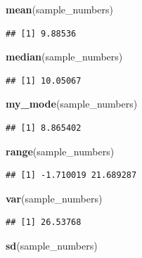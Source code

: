 \documentclass[]{book}
\newenvironment{Shaded}{\begin{snugshade}}{\end{snugshade}}
\newcommand{\KeywordTok}[1]{\textcolor[rgb]{0.13,0.29,0.53}{\textbf{{#1}}}}
\newcommand{\NormalTok}[1]{{#1}}
\theoremstyle{definition}
\theoremstyle{definition}
\theoremstyle{definition}
\theoremstyle{remark}
\begin{document}
\begin{Shaded}
\begin{Highlighting}[]
\KeywordTok{mean}\NormalTok{(sample_numbers)}
\end{Highlighting}
\end{Shaded}

\begin{verbatim}
## [1] 9.88536
\end{verbatim}

\begin{Shaded}
\begin{Highlighting}[]
\KeywordTok{median}\NormalTok{(sample_numbers)}
\end{Highlighting}
\end{Shaded}

\begin{verbatim}
## [1] 10.05067
\end{verbatim}

\begin{Shaded}
\begin{Highlighting}[]
\KeywordTok{my_mode}\NormalTok{(sample_numbers)}
\end{Highlighting}
\end{Shaded}

\begin{verbatim}
## [1] 8.865402
\end{verbatim}

\begin{Shaded}
\begin{Highlighting}[]
\KeywordTok{range}\NormalTok{(sample_numbers)}
\end{Highlighting}
\end{Shaded}

\begin{verbatim}
## [1] -1.710019 21.689287
\end{verbatim}

\begin{Shaded}
\begin{Highlighting}[]
\KeywordTok{var}\NormalTok{(sample_numbers)}
\end{Highlighting}
\end{Shaded}

\begin{verbatim}
## [1] 26.53768
\end{verbatim}

\begin{Shaded}
\begin{Highlighting}[]
\KeywordTok{sd}\NormalTok{(sample_numbers)}
\end{Highlighting}
\end{Shaded}
\end{document}

